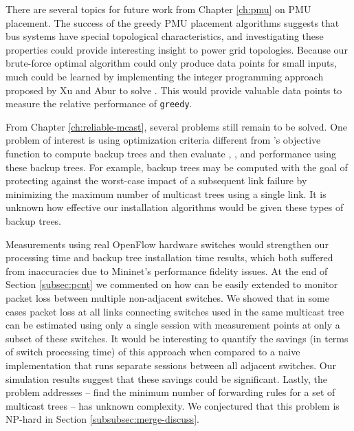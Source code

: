 
There are several topics for future work from Chapter \ref{ch:pmu} on PMU placement. The success of the greedy PMU placement algorithms suggests that bus systems have special topological characteristics,
and investigating these properties could provide interesting insight to power grid topologies. 
Because our brute-force optimal algorithm could only produce data points for small inputs, much could be learned by implementing  
the integer programming approach proposed by Xu and Abur \cite{Xu04} to solve \fulls.  This would provide valuable data points to measure the relative performance of {\tt greedy}.


From Chapter \ref{ch:reliable-mcast}, several problems still remain to be solved. One problem of interest is using optimization criteria different from \mcs's objective function 
to compute backup trees and then evaluate \pres, \posts, and \merge performance using these backup trees.  
For example, backup trees may be computed with the goal of protecting against the worst-case impact of a subsequent link failure
by minimizing the maximum number of multicast trees using a single link. %
It is unknown how effective our installation algorithms would be given these types of backup trees. %

Measurements using real OpenFlow hardware switches would strengthen our \pcnt processing time and backup tree installation time results, which both suffered from inaccuracies due to Mininet's
performance fidelity issues.  At the end of Section \ref{subsec:pcnt} we commented on how \pcnt can be easily extended to monitor packet loss between multiple non-adjacent switches.  We showed
that in some cases packet loss at all links connecting switches used in the same multicast tree can be estimated using only a single \pcnt session 
with measurement points at only a subset of these switches. It would be
interesting to quantify the savings (in terms of switch processing time) of this approach when compared to a naive implementation that runs separate \pcnt sessions between all adjacent switches.  Our 
\pcnt simulation results suggest that these savings could be significant. 
Lastly, the problem \merge addresses -- find the minimum number of forwarding rules for a set of multicast trees -- has unknown complexity.
We conjectured that this problem is NP-hard in Section \ref{subsubsec:merge-discuss}. 

